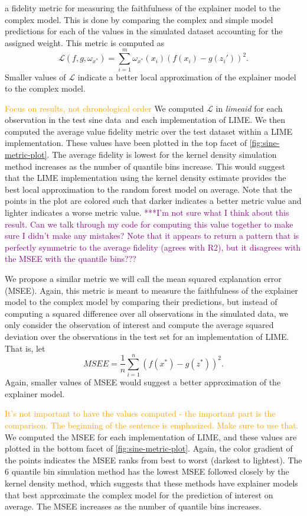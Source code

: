 \documentclass[AMS,STIX2COL]{WileyNJD-v2}\usepackage[]{graphicx}\usepackage[]{color}
\newcommand{\hh}[1]{\textcolor{orange}{#1}}
\newcommand{\kgc}[1]{\textcolor{purple}{#1}}
\newcommand{\data}{sine data}
\begin{document}
{a fidelity metric for measuring the faithfulness of the explainer model to the complex model. This is done by comparing the complex and simple model predictions for each of the values in the simulated dataset accounting for the assigned weight. This metric is computed as $$\mathcal{L}(f, g, \omega_{x^*}) = \sum_{i=1}^{m}\omega_{x^*}(x_i)\left(f(x_i)-g\left(z_i'\right)\right)^2.$$ Smaller values of $\mathcal{L}$ indicate a better local approximation of the explainer model to the complex model.

\hh{Focus on results, not chronological order}
We computed $\mathcal{L}$ in \emph{limeaid} for each observation in the test \data \ and each implementation of LIME. We then computed the average value fidelity metric over the test dataset within a LIME implementation. These values have been plotted in the top facet of \autoref{fig:sine-metric-plot}. The average fidelity is lowest for the kernel density simulation method increases as the number of quantile bins increase. This would suggest that the LIME implementation using the kernel density estimate provides the best local approximation to the random forest model on average. Note that the points in the plot are colored such that darker indicates a better metric value and lighter indicates a worse metric value. \kgc{***I'm not sure what I think about this result. Can we talk through my code for computing this value together to make sure I didn't make any mistakes? Note that it appears to return a pattern that is perfectly symmetric to the average fidelity (agrees with R2), but it disagrees with the MSEE with the quantile bins???}

We propose a similar metric we will call the mean squared explanation error (MSEE). Again, this metric is meant to measure the faithfulness of the explainer model to the complex model by comparing their predictions, but instead of computing a squared difference over all observations in the simulated data, we only consider the observation of interest and compute the average squared deviation over the observations in the test set for an implementation of LIME. That is, let $$MSEE=\frac{1}{n}\sum_{i=1}^n\left(f\left(x^*\right)-g\left(z^*\right)\right)^2.$$ Again, smaller values of MSEE would suggest a better approximation of the explainer model.



\hh{It's not important to have the values computed - the important part is the comparison. The beginning of the sentence is emphasized. Make sure to use that.}
We computed the MSEE for each implementation of LIME, and these values are plotted in the bottom facet of \autoref{fig:sine-metric-plot}. Again, the color gradient of the points indicates the MSEE ranks from best to worst (darkest to lightest). The 6 quantile bin simulation method has the lowest MSEE followed closely by the kernel density method, which suggests that these methods have explainer models that best approximate the complex model for the prediction of interest on average. The MSEE increases as the number of quantile bins increases.

}
\end{document}
